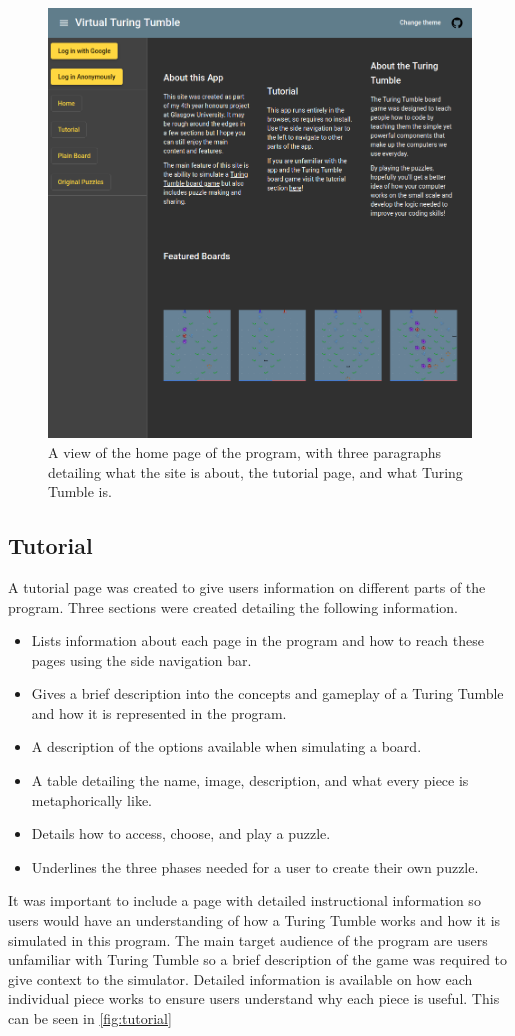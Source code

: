 \documentclass{l4proj}
\begin{document}
\begin{figure}
    \centering
    \includegraphics[width=0.65\linewidth]{images/darkTheme.png}
    \caption{A view of the home page of the program, with three paragraphs detailing what the site is about, the tutorial page, and what Turing Tumble is.}
    \label{fig:homePage}
\end{figure}

\subsection{Tutorial}
A tutorial page was created to give users information on different parts of the program. Three sections were created detailing the following information.
\begin{itemize}
    \item Lists information about each page in the program and how to reach these pages using the side navigation bar.
    \item Gives a brief description into the concepts and gameplay of a Turing Tumble and how it is represented in the program.
    \item A description of the options available when simulating a board.
    \item A table detailing the name, image, description, and what every piece is metaphorically like.
    \item Details how to access, choose, and play a puzzle.
    \item Underlines the three phases needed for a user to create their own puzzle.
\end{itemize}

It was important to include a page with detailed instructional information so users would have an understanding of how a Turing Tumble works and how it is simulated in this program. The main target audience of the program are users unfamiliar with Turing Tumble so a brief description of the game was required to give context to the simulator. Detailed information is available on how each individual piece works to ensure users understand why each piece is useful. This can be seen in \ref{fig:tutorial}
\end{document}
